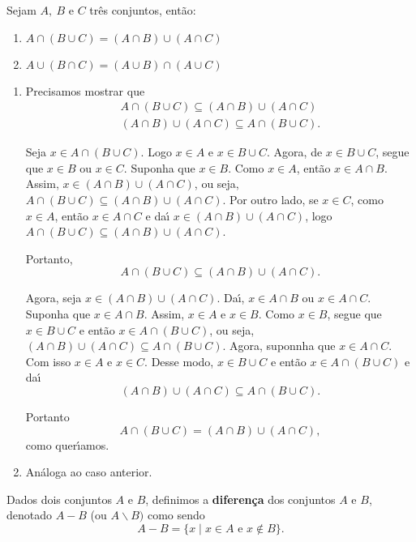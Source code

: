 \begin{proposicao} Sejam $A,\ B$ e $C$ tr{\^e}s conjuntos, ent{\~a}o:
\begin{enumerate}
\item $A\cap(B\cup C)=(A\cap B)\cup(A\cap C)$
\item $A\cup(B\cap C)=(A\cup B)\cap(A\cup C)$
\end{enumerate}
\end{proposicao}
\begin{prova}
	\begin{enumerate}
\item Precisamos mostrar que
\begin{align*}
A\cap(B\cup C)\subseteq(A\cap B)\cup(A\cap C)\\
(A\cap B)\cup(A\cap C)\subseteq A\cap(B\cup C).
\end{align*}

Seja $x\in A\cap(B\cup C)$. Logo $x\in A$ e $x\in B\cup C$. Agora, de $x\in B\cup C$, segue que $x\in B$ ou $x\in C$. Suponha que $x\in B$. Como $x\in A$, ent\~ao $x\in A\cap B$. Assim, $x\in(A\cap B)\cup(A\cap C)$, ou seja, $A\cap(B\cup C)\subseteq(A\cap B)\cup(A\cap C)$. Por outro lado, se $x\in C$, como $x\in A$, ent{\~a}o $x\in A\cap C$ e da{\'\i} $x\in(A\cap B)\cup(A\cap C)$, logo $A\cap(B\cup C)\subseteq(A\cap B)\cup(A\cap C)$.

Portanto,
\[
	A\cap(B\cup C)\subseteq(A\cap B)\cup(A\cap C).
\]

Agora, seja $x\in(A\cap B)\cup(A\cap C)$. Da{\'\i}, $x\in A\cap B$ ou $x\in A\cap C$. Suponha que $x\in A\cap B$. Assim, $x\in A$ e $x\in B$. Como $x\in B$, segue que $x\in B\cup C$ e ent{\~a}o $x\in A\cap(B\cup C)$, ou seja, $(A\cap B)\cup(A\cap C)\subseteq A\cap(B\cup C)$. Agora, suponnha que $x\in A\cap C$. Com isso $x\in A$ e $x\in C$. Desse modo, $x\in B\cup C$ e ent{\~a}o $x\in A\cap(B\cup C)$ e da{\'\i}
\[
	(A\cap B)\cup(A\cap C)\subseteq A\cap(B\cup C).
\]

Portanto
\[
	A\cap(B\cup C)=(A\cap B)\cup(A\cap C),
\]
como quer{\'\i}amos.
\item An\'aloga ao caso anterior.
\end{enumerate}
\end{prova}

\begin{definicao}
Dados dois conjuntos $A$ e $B$, definimos a \textbf{diferen{\c c}a} dos conjuntos $A$ e $B$, denotado $A-B$ (ou $A\backslash B)$ como sendo
\[
A - B = \{x \mid x \in A \mbox{ e } x \notin B\}.
\]
\end{definicao}

